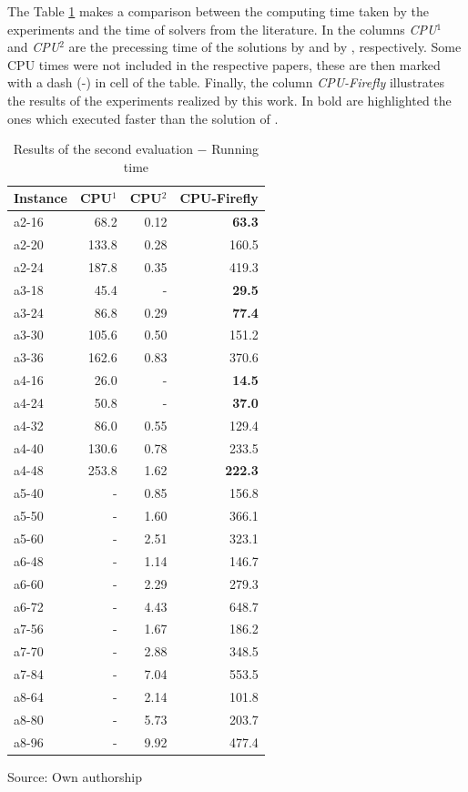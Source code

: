 \documentclass[tuberlin,cic,tc,openright,english,noabntcite,oneside]{iiufrgs}
\begin{document}
The Table \ref{tab:evaluation-2.2} makes a comparison between the computing time taken by the experiments and the time of solvers from the literature. In the columns \emph{CPU$^1$} and \emph{CPU$^2$} are the precessing time of the solutions by \textcite{parragh_introducing_2011} and by \textcite{parragh_hybrid_2013}, respectively. Some CPU times were not included in the respective papers, these are then marked with a dash (-) in cell of the table. Finally, the column \emph{CPU-Firefly} illustrates the results of the experiments realized by this work. In bold are highlighted the ones which executed faster than the solution of \textcite{parragh_introducing_2011}.
\begin{table}[H]
\centering
\caption{Results of the second evaluation $-$ Running time}
\begin{tabular}{l | r | r | r}
\hline
Instance & CPU$^1$ & CPU$^2$ & CPU-Firefly\\
\hline
a2-16 & 	68.2 	& 	0.12 & 	\textbf{63.3} \\
a2-20 & 	133.8 	& 	0.28 & 	160.5 \\
a2-24 & 	187.8 	& 	0.35 & 	419.3 \\
a3-18 & 	45.4 	& 	- & 	\textbf{29.5} \\
a3-24 & 	86.8 	& 	0.29 & 	\textbf{77.4} \\
a3-30 & 	105.6 	& 	0.50 & 	151.2 \\
a3-36 & 	162.6 	& 	0.83 & 	370.6 \\
a4-16 & 	26.0 	& 	- & 	\textbf{14.5} \\
a4-24 & 	50.8 	& 	- & 	\textbf{37.0} \\
a4-32 & 	86.0 		& 	0.55 & 	129.4 \\
a4-40 & 	130.6 	& 	0.78 & 	233.5 \\
a4-48 & 	253.8 	& 	1.62 & 	\textbf{222.3} \\
a5-40 & 	- & 	0.85 & 	156.8 \\
a5-50 & 	- & 	1.60 & 	366.1 \\
a5-60 & 	- & 	2.51 & 	323.1 \\
a6-48 & 	- & 	1.14 & 	146.7 \\
a6-60 & 	- & 	2.29 & 	279.3 \\
a6-72 & 	- & 	4.43 & 	648.7 \\
a7-56 & 	- & 	1.67 & 	186.2 \\
a7-70 & 	- & 	2.88 & 	348.5 \\
a7-84 & 	- & 	7.04 & 	553.5 \\
a8-64 & 	- & 	2.14 & 	101.8 \\
a8-80 & 	- & 	5.73 & 	203.7 \\
a8-96 & 	- & 	9.92 & 	477.4 \\
\hline
\end{tabular}
\center Source: Own authorship
\label{tab:evaluation-2.2}
\end{table}
\end{document}
